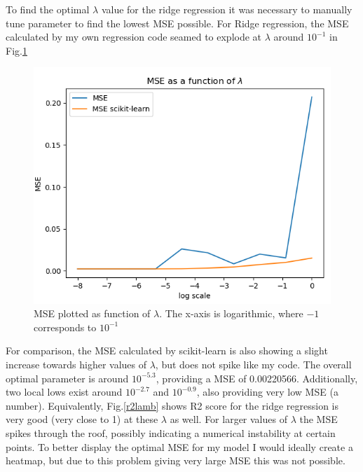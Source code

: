 \documentclass[a4paper,11pt,twocolumn]{article}
\begin{document}
To find the optimal $\lambda$ value for the ridge regression it was necessary to manually tune parameter to find the lowest MSE possible. For Ridge regression, the MSE calculated by my own regression code seamed to explode at $\lambda$ around $10^{-1}$ in Fig.\ref{mselamb}
\begin{figure}[h]
\centering
\includegraphics[scale=0.75]{mselam}
\caption{MSE plotted as function of $\lambda$. The x-axis is logarithmic, where $-1$ corresponds to $10^{-1}$}
\label{mselamb}
\end{figure}
For comparison, the MSE calculated by scikit-learn is also showing a slight increase towards higher values of $\lambda$, but does not spike like my code. The overall optimal parameter is around $10^{-5.3}$, providing a MSE of 0.00220566. Additionally, two local lows exist around $10^{-2.7}$ and $10^{-0.9}$, also providing very low MSE (a number). 
Equivalently, Fig.\ref{r2lamb} shows R2 score for the ridge regression is very good (very close to 1) at these $\lambda$ as well.
For larger values of $\lambda$ the MSE spikes through the roof, possibly indicating a numerical instability at certain points. To better display the optimal MSE for my model I would ideally create a heatmap, but due to this problem giving very large MSE this was not possible. 
\end{document}
